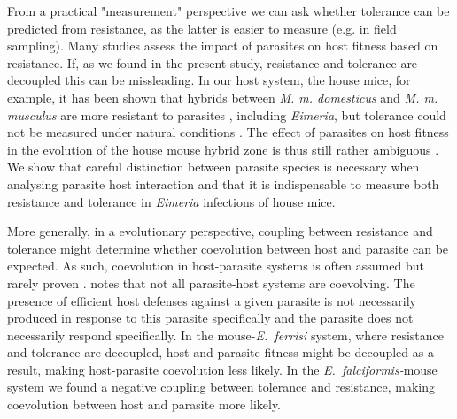 From a practical "measurement"  perspective we can ask whether tolerance can be predicted from resistance, as the latter is easier to measure (e.g. in field sampling). Many studies assess the impact of parasites on host fitness based on resistance. If, as we found in the present study, resistance and tolerance are decoupled this can be missleading. In our host system, the house mice, for example, it has been shown that hybrids between \textit{M. m. domesticus} and \textit{M. m. musculus} are more resistant to parasites \citep{baird_where_2012}, including \textit{Eimeria}, but tolerance could not be measured under natural conditions \citep{Balard2020}. The effect of parasites on host fitness in the evolution of the house mouse hybrid zone is thus still rather ambiguous \citep{baird_shifting_2019}. We show that careful distinction between parasite species is necessary when analysing parasite host interaction \parencite[see also][]{jarquin-diaz_detection_2019} and that it is indispensable to measure both resistance and tolerance in \textit{Eimeria} infections of house mice. \par

More generally, in a evolutionary perspective, coupling between resistance and tolerance might determine whether coevolution between host and parasite can be expected. As such, coevolution in host-parasite systems is often assumed but rarely proven \citep{Woolhouse2002}. \cite{Janzen1980} notes that not all parasite-host systems are coevolving. The presence of efficient host defenses against a given parasite is not necessarily produced in response to this parasite specifically and the parasite does not necessarily respond specifically. In the mouse-\textit{E.~ferrisi} system, where resistance and tolerance are decoupled, host and parasite fitness might be decoupled as a result, making host-parasite coevolution less likely. In the \textit{E.~falciformis-}mouse system we found a negative coupling between tolerance and resistance, making coevolution between host and parasite more likely. \par

